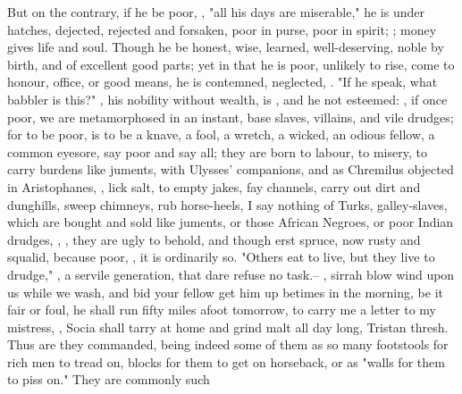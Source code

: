 But on the contrary, if he be poor, , "all his days
are miserable," he is under hatches, dejected, rejected and forsaken, poor in
purse, poor in spirit; ; money gives life and soul. Though he be
honest, wise, learned, well-deserving, noble by birth, and of excellent good
parts; yet in that he is poor, unlikely to rise, come to honour, office, or
good means, he is contemned, neglected, . "If he speak, what babbler is
this?" , his nobility without wealth, is , and he not esteemed: , if once poor, we are metamorphosed in an instant, base
slaves, villains, and vile drudges; for to be poor, is to
be a knave, a fool, a wretch, a wicked, an odious fellow, a common eyesore, say
poor and say all; they are born to labour, to misery, to carry burdens like
juments,  with Ulysses' companions, and as
Chremilus objected in Aristophanes, ,
lick salt, to empty jakes, fay channels, carry out dirt
and dunghills, sweep chimneys, rub horse-heels, \etc{} I say nothing of Turks,
galley-slaves, which are bought and sold like juments, or
those African Negroes, or poor Indian drudges, , \etc{} , they are ugly to behold, and though erst spruce, now rusty and squalid,
because poor, , it is ordinarily so. "Others eat to live, but they
live to drudge," , a servile generation, that dare refuse no task.--
, sirrah blow wind upon us while we wash, and bid your
fellow get him up betimes in the morning, be it fair or foul, he shall run
fifty miles afoot tomorrow, to carry me a letter to my mistress, , Socia shall tarry at home and grind malt all day long, Tristan
thresh. Thus are they commanded, being indeed some of them as so many
footstools for rich men to tread on, blocks for them to get on horseback, or as
"walls for them to piss on." They are commonly such
